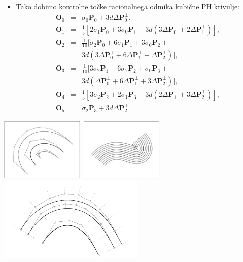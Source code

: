 \documentclass[12pt]{beamer}
\theoremstyle{definition} %
\theoremstyle{plain} %
\begin{document}
    \begin{frame}
        \begin{itemize}
            \item Tako dobimo kontrolne točke racionalnega odmika kubične PH krivulje:
                \begin{eqnarray}
                    \textbf{O}_0 &=& \sigma_0 \textbf{P}_0 + 3 d \Delta \textbf{P}_0^{\perp},\nonumber \\
                    \textbf{O}_1 &=& \frac{1}{5} [2 \sigma_1 \textbf{P}_0 + 3\sigma_0 \textbf{P}_1 + 3 d (3 \Delta \textbf{P}_0^{\perp} + 2 \Delta \textbf{P}_1^{\perp})],\nonumber \\
                    \textbf{O}_2 &=& \frac{1}{10} [\sigma_2 \textbf{P}_0 + 6\sigma_1 \textbf{P}_1 + 3\sigma_0 \textbf{P}_2 + \nonumber \\
                        & & 3 d (3 \Delta \textbf{P}_0^{\perp} + 6 \Delta \textbf{P}_1^{\perp} + \Delta \textbf{P}_2^{\perp})],\nonumber \\
                    \textbf{O}_3 &=& \frac{1}{10} [3\sigma_2 \textbf{P}_1 + 6\sigma_1 \textbf{P}_2 + \sigma_0 \textbf{P}_3 + \nonumber \\
                        & & 3 d (\Delta \textbf{P}_0^{\perp} + 6 \Delta \textbf{P}_1^{\perp} + 3 \Delta \textbf{P}_2^{\perp})],\nonumber \\
                    \textbf{O}_4 &=& \frac{1}{5} [3\sigma_2 \textbf{P}_2 + 2\sigma_1 \textbf{P}_3 + 3 d (2\Delta \textbf{P}_1^{\perp} + 3 \Delta \textbf{P}_2^{\perp})],\nonumber \\
                    \textbf{O}_5 &=& \sigma_2 \textbf{P}_3 + 3 d \Delta \textbf{P}_2^{\perp}\nonumber
                \end{eqnarray}
                
        \end{itemize}
    \end{frame}

    \begin{frame}
        \centering
        \includegraphics[width=4cm]{slika_5.png}
        \includegraphics[width=4cm]{slika_4.png}
        \includegraphics[width=7cm]{slika_3.png}
    \end{frame}
\end{document}
